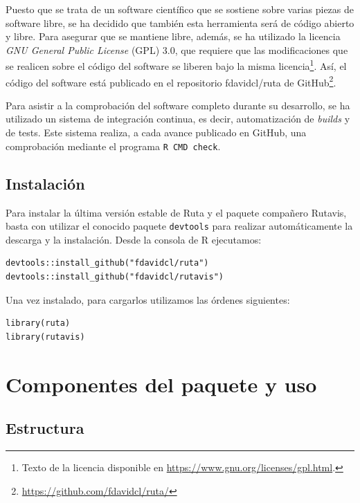 Puesto que se trata de un software científico que se sostiene sobre varias piezas de software libre, se ha decidido que también esta herramienta será de código abierto y libre. Para asegurar que se mantiene libre, además, se ha utilizado la licencia \textit{GNU General Public License} (GPL) 3.0, que requiere que las modificaciones que se realicen sobre el código del software se liberen bajo la misma licencia\footnote{Texto de la licencia disponible en \url{https://www.gnu.org/licenses/gpl.html}.}. Así, el código del software está publicado en el repositorio fdavidcl/ruta de GitHub\footnote{\url{https://github.com/fdavidcl/ruta/}}.

Para asistir a la comprobación del software completo durante su desarrollo, se ha utilizado un sistema de integración continua, es decir, automatización de \textit{builds} y de tests. Este sistema realiza, a cada avance publicado en GitHub, una comprobación mediante el programa \texttt{R CMD check}.

\subsection{Instalación}

Para instalar la última versión estable de Ruta y el paquete compañero Rutavis, basta con utilizar el conocido paquete \texttt{devtools} \autocite{devtools} para realizar automáticamente la descarga y la instalación. Desde la consola de R ejecutamos:
\begin{lstlisting}[numbers=none]
devtools::install_github("fdavidcl/ruta")
devtools::install_github("fdavidcl/rutavis")
\end{lstlisting}

Una vez instalado, para cargarlos utilizamos las órdenes siguientes:
\begin{lstlisting}[numbers=none]
library(ruta)
library(rutavis)
\end{lstlisting}


\section{Componentes del paquete y uso}\label{componentes-del-paquete}

\subsection{Estructura}

